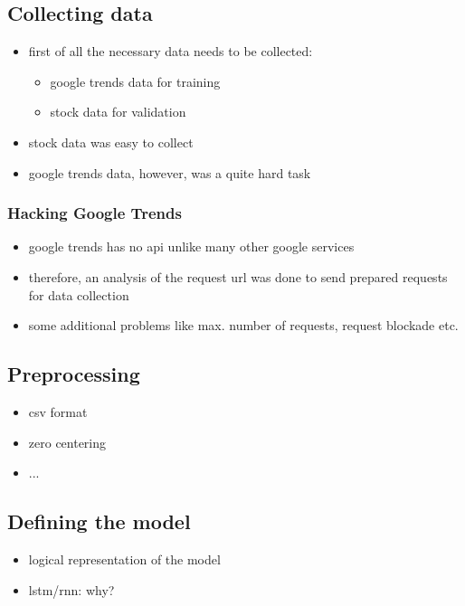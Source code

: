 \documentclass{IEEEtran}
\begin{document}
\subsection{Collecting data}
\label{subsec:collectingdata}
\begin{itemize}
	\item{first of all the necessary data needs to be collected: \\
		\begin{itemize}
			\item google trends data for training
			\item stock data for validation
		\end{itemize}
}
	\item stock data was easy to collect
	\item google trends data, however, was a quite hard task
\end{itemize}

\subsubsection{Hacking Google Trends}
\label{subsubsec:hackinggoogletrends}
\begin{itemize}
	\item google trends has no api unlike many other google services
	\item therefore, an analysis of the request url was done to send prepared requests for data collection
	\item some additional problems like max. number of requests, request blockade etc.
\end{itemize}

\subsection{Preprocessing}
\label{subsec:preprocessing}
\begin{itemize}
	\item csv format
	\item zero centering
	\item ...
\end{itemize}

\subsection{Defining the model}
\label{subsec:modeldefinition}
\begin{itemize}
	\item logical representation of the model
	\item lstm/rnn: why?
\end{itemize}
\end{document}
